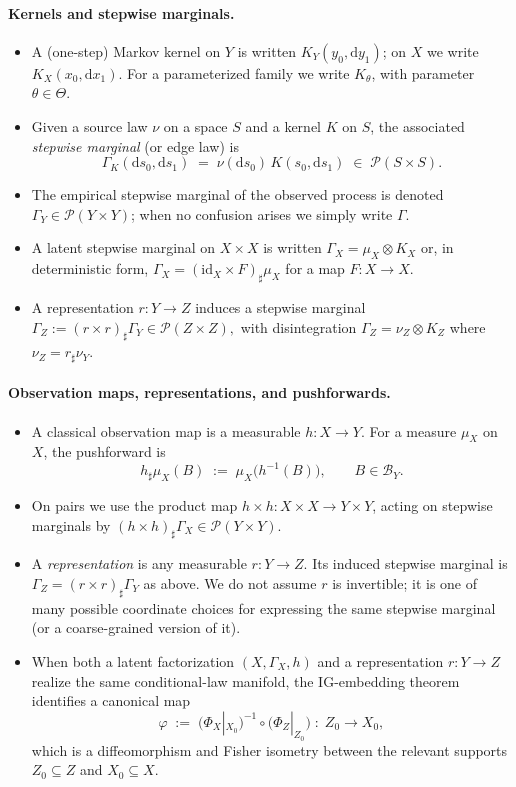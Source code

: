 \documentclass[11pt]{article}
\newcommand{\1}{\mathbf{1}}
\begin{document}
\paragraph{Kernels and stepwise marginals.}
\begin{itemize}[leftmargin=1.7em,itemsep=2pt,topsep=2pt]
  \item A (one-step) Markov kernel on $Y$ is written $K_Y(y_0,\mathrm{d}y_1)$; on $X$ we write $K_X(x_0,\mathrm{d}x_1)$. For a parameterized family we write $K_\theta$, with parameter $\theta\in\Theta$.
  \item Given a source law $\nu$ on a space $S$ and a kernel $K$ on $S$, the associated \emph{stepwise marginal} (or edge law) is
  \[
    \Gamma_K(\mathrm{d}s_0,\mathrm{d}s_1)
    \;=\;
    \nu(\mathrm{d}s_0)\,K(s_0,\mathrm{d}s_1)
    \;\in\; \mathcal{P}(S\times S).
  \]
  \item The empirical stepwise marginal of the observed process is denoted
  \(
    \Gamma_Y
    \in \mathcal{P}(Y\times Y)
  \);
  when no confusion arises we simply write $\Gamma$.
  \item A latent stepwise marginal on $X\times X$ is written $\Gamma_X = \mu_X \otimes K_X$ or, in deterministic form,
  \(
    \Gamma_X = (\mathrm{id}_X\times F)_\sharp \mu_X
  \)
  for a map $F:X\to X$.
  \item A representation $r:Y\to Z$ induces a stepwise marginal
  \(
    \Gamma_Z := (r\times r)_\sharp \Gamma_Y
    \in \mathcal{P}(Z\times Z),
  \)
  with disintegration $\Gamma_Z = \nu_Z \otimes K_Z$ where $\nu_Z = r_\sharp\nu_Y$.
\end{itemize}

\paragraph{Observation maps, representations, and pushforwards.}
\begin{itemize}[leftmargin=1.7em,itemsep=2pt,topsep=2pt]
  \item A classical observation map is a measurable $h:X\to Y$. For a measure $\mu_X$ on $X$, the pushforward is
  \[
    h_\sharp \mu_X(B) \;:=\; \mu_X\big(h^{-1}(B)\big),
    \qquad B\in\mathcal{B}_Y.
  \]
  \item On pairs we use the product map $h\times h:X\times X\to Y\times Y$, acting on stepwise marginals by
  \(
    (h\times h)_\sharp \Gamma_X \in \mathcal{P}(Y\times Y).
  \)
  \item A \emph{representation} is any measurable $r:Y\to Z$. Its induced stepwise marginal is $\Gamma_Z=(r\times r)_\sharp\Gamma_Y$ as above. We do not assume $r$ is invertible; it is one of many possible coordinate choices for expressing the same stepwise marginal (or a coarse-grained version of it).
  \item When both a latent factorization $(X,\Gamma_X,h)$ and a representation $r:Y\to Z$ realize the same conditional-law manifold, the IG-embedding theorem identifies a canonical map
  \[
    \varphi
    \;:=\;
    \bigl(\Phi_X|_{X_0}\bigr)^{-1}\!\circ\!\bigl(\Phi_Z|_{Z_0}\bigr)
    \;:\;
    Z_0 \to X_0,
  \]
  which is a diffeomorphism and Fisher isometry between the relevant supports $Z_0\subseteq Z$ and $X_0\subseteq X$.
\end{itemize}
\end{document}
